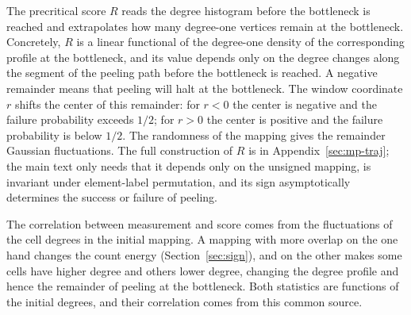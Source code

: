 The precritical score $R$ reads the degree histogram before the bottleneck is reached and extrapolates how many degree-one vertices
remain at the bottleneck. Concretely, $R$ is a linear functional of the degree-one density of the corresponding profile at the
bottleneck, and its value depends only on the degree changes along the segment of the peeling path before the bottleneck is reached. A
negative remainder means that peeling will halt at the bottleneck. The window coordinate $r$ shifts the center of this remainder: for
$r<0$ the center is negative and the failure probability exceeds $1/2$; for $r>0$ the center is positive and the failure probability
is below $1/2$. The randomness of the mapping gives the remainder Gaussian fluctuations. The full construction of $R$ is in
Appendix~\ref{sec:mp-traj}; the main text only needs that it depends only on the unsigned mapping, is invariant under element-label
permutation, and its sign asymptotically determines the success or failure of peeling.

The correlation between measurement and score comes from the fluctuations of the cell degrees in the initial mapping. A mapping with
more overlap on the one hand changes the count energy (Section~\ref{sec:sign}), and on the other makes some cells have higher degree
and others lower degree, changing the degree profile and hence the remainder of peeling at the bottleneck. Both statistics are
functions of the initial degrees, and their correlation comes from this common source.

